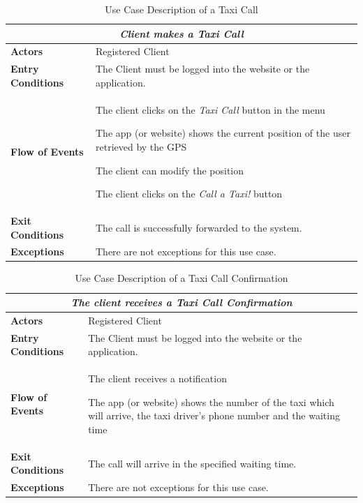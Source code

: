 \documentclass[a4paper]{article}
\begin{document}
\begin{table} [H]
\begin{center}
\begin{tabular}{ |m{}|m{}|  }
\hline
    \multicolumn{2}{|c|}{\textbf{\textit{Client makes a Taxi Call}}} \\
\hline \hline
    \textbf{Actors}
&   Registered Client
\\ \hline
    \textbf{Entry Conditions}
&   The Client must be logged into the website or the application.
\\ \hline
    \textbf{Flow of Events}
& 
    \begin{enumerate*}
    \item The client clicks on the \emph{Taxi Call} button in the menu
    \item The app (or website) shows the current position of the user retrieved by the GPS
    \item The client can modify the position
    \item The client clicks on the \emph{Call a Taxi!} button
    \end{enumerate*}
\\ \hline
    \textbf{Exit Conditions}
&   The call is successfully forwarded to the system.
\\ \hline
    \textbf{Exceptions}
&   
    There are not exceptions for this use case.
\\ \hline
\end{tabular}
\end{center}
\caption{Use Case Description of a Taxi Call}
\label{table:clientcall}
\end{table}

\begin{table} [H]
\begin{center}
\begin{tabular}{ |m{}|m{}|  }
\hline
    \multicolumn{2}{|c|}{\textbf{\textit{The client receives a Taxi Call Confirmation}}} \\
\hline \hline
    \textbf{Actors}
&   Registered Client
\\ \hline
    \textbf{Entry Conditions}
&   The Client must be logged into the website or the application.
\\ \hline
    \textbf{Flow of Events}
& 
    \begin{enumerate*}
    \item The client receives a notification
    \item The app (or website) shows the number of the taxi which will arrive, the taxi driver's phone number and the waiting time
    \end{enumerate*}
\\ \hline
    \textbf{Exit Conditions}
&   The call will arrive in the specified waiting time.
\\ \hline
    \textbf{Exceptions}
&   
    There are not exceptions for this use case.
\\ \hline
\end{tabular}
\end{center}
\caption{Use Case Description of a Taxi Call Confirmation}
\label{table:clientconfirmation}
\end{table}
\end{document}
